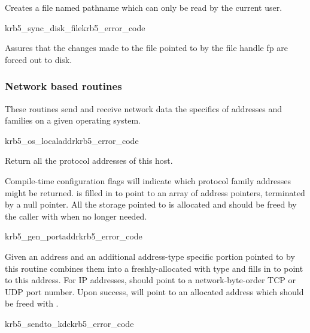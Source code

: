 Creates a file named pathname which can only be read by the current
user.

\begin{funcdecl}{krb5_sync_disk_file}{krb5_error_code}{\funcin}
\end{funcdecl}

Assures that the changes made to the file pointed to by the file
handle
fp are forced out to disk.

\subsubsection{Network based routines}

These routines send and receive network data the specifics 
of addresses and families on a given operating system.

\begin{funcdecl}{krb5_os_localaddr}{krb5_error_code}{\funcin}
\funcout
{}
\end{funcdecl}

Return all the protocol addresses of this host.

Compile-time configuration flags will indicate which protocol family
addresses might be returned.
 is filled in to point to an array of address pointers,
terminated by a null pointer.  All the storage pointed to is allocated
and should be freed by the caller with 
when no longer needed.

\begin{funcdecl}{krb5_gen_portaddr}{krb5_error_code}{\funcin}
\funcout
{}
\end{funcdecl}

Given an address  and an additional address-type specific
portion pointed to by
 this routine
combines them into a freshly-allocated
 with type  and fills in
 to point to this address.  For IP addresses,
 should point to a network-byte-order TCP or UDP port
number.  Upon success,  will point to an allocated
address which should be freed with .


\begin{funcdecl}{krb5_sendto_kdc}{krb5_error_code}{\funcin}
\funcout
{}
\end{funcdecl}

